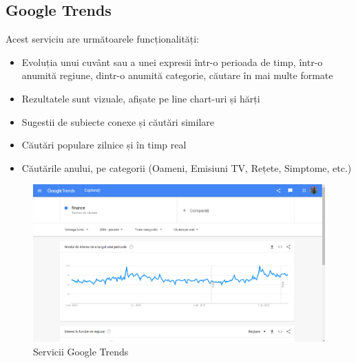 \subsection{Google Trends}
{\noindent Acest serviciu are următoarele funcționalități:}
\begin{itemize}
    \setlength\itemsep{0.5em}
    \item Evoluția unui cuvânt sau a unei expresii într-o perioada de timp, într-o anumită regiune, dintr-o anumită categorie, căutare în mai multe formate
    \item Rezultatele sunt vizuale, afișate pe line chart-uri și hărți
    \item Sugestii de subiecte conexe și căutări similare
    \item Căutări populare zilnice și în timp real
    \item Căutările anului, pe categorii (Oameni, Emisiuni TV, Rețete, Simptome, etc.)
\end{itemize}
\begin{figure}[H]
	\centering
	\includegraphics[width=150mm]{figs/googleTrends.png}
    \caption{Servicii Google Trends}
	\label{fig:googleTrends}
\end{figure}




